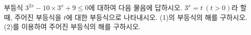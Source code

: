 부등식 $3^{2x}-10\times 3^x+9\le 0$에 대하여 다음 물음에 답하시오.
 $3^x=t\ (t>0)$라 할 때, 주어진 부등식을 $t$에 대한 부등식으로 나타내시오.
 (1)의 부등식의 해를 구하시오.
 (2)를 이용하여 주어진 부등식의 해를 구하시오.
